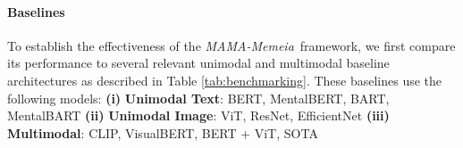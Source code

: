 \documentclass[letterpaper]{article} %
\newcommand{\model}{\textit{MAMA-Memeia}}
\begin{document}




\paragraph{Baselines} To establish the effectiveness of the \model\ framework, we first compare its performance to several relevant unimodal and multimodal baseline architectures as described in Table \ref{tab:benchmarking}. These baselines use the following models:
\textbf{(i)} \textbf{Unimodal Text}: BERT, MentalBERT, BART, MentalBART
\textbf{(ii)} \textbf{Unimodal Image}: ViT, ResNet, EfficientNet
\textbf{(iii)} \textbf{Multimodal}: CLIP, VisualBERT, BERT + ViT, SOTA \citep{Yadav-etal-2023-towards}
\end{document}
